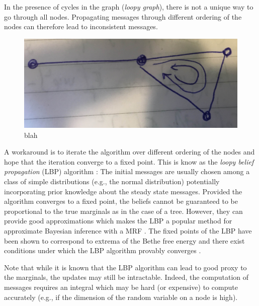 In the presence of cycles in the graph (\emph{loopy graph}), there is not a unique way to go through all nodes. 
Propagating messages through different ordering of the nodes can therefore lead to inconsistent messages. 
 
\begin{figure}[!h]
\center
\includegraphics[width=.6\textwidth]{figures/draft/schema_loop}
\caption{blah}
\end{figure}

A workaround is to iterate the algorithm over different ordering of the nodes and hope that the iteration converge to a fixed point. This is know as the \emph{loopy belief propagation} (LBP) algorithm \citep{pearl88, yedidia02}:
%
%
The initial messages are usually chosen among a class of simple distributions (e.g., the normal distribution) potentially incorporating prior knowledge about the steady state messages. 
Provided the algorithm converges to a fixed point, the beliefs cannot be guaranteed to be proportional to the true marginals as in the case of a tree. However, they can provide good approximations which makes the LBP a popular method for approximate Bayesian inference with a MRF \citep{sudderth03}. The fixed points of the LBP have been shown to correspond to extrema of the Bethe free energy \cite{yedidia02} and there exist conditions under which the LBP algorithm provably converges \citep{heskes04,ihler05}.

Note that while it is known that the LBP algorithm can lead to good proxy to the marginals, the updates may still be intractable. Indeed, the computation of messages requires an integral which may be hard (or expensive) to compute accurately (e.g., if the dimension of the random variable on a node is high).







